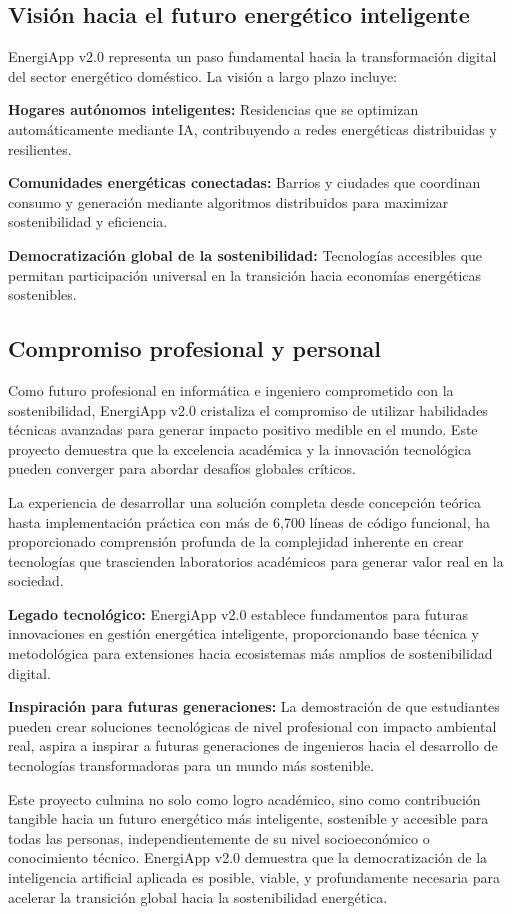 \subsection{Visión hacia el futuro energético inteligente}

EnergiApp v2.0 representa un paso fundamental hacia la transformación digital del sector energético doméstico. La visión a largo plazo incluye:

\textbf{Hogares autónomos inteligentes:} Residencias que se optimizan automáticamente mediante IA, contribuyendo a redes energéticas distribuidas y resilientes.

\textbf{Comunidades energéticas conectadas:} Barrios y ciudades que coordinan consumo y generación mediante algoritmos distribuidos para maximizar sostenibilidad y eficiencia.

\textbf{Democratización global de la sostenibilidad:} Tecnologías accesibles que permitan participación universal en la transición hacia economías energéticas sostenibles.

\subsection{Compromiso profesional y personal}

Como futuro profesional en informática e ingeniero comprometido con la sostenibilidad, EnergiApp v2.0 cristaliza el compromiso de utilizar habilidades técnicas avanzadas para generar impacto positivo medible en el mundo. Este proyecto demuestra que la excelencia académica y la innovación tecnológica pueden converger para abordar desafíos globales críticos.

La experiencia de desarrollar una solución completa desde concepción teórica hasta implementación práctica con más de 6,700 líneas de código funcional, ha proporcionado comprensión profunda de la complejidad inherente en crear tecnologías que trascienden laboratorios académicos para generar valor real en la sociedad.

\textbf{Legado tecnológico:} EnergiApp v2.0 establece fundamentos para futuras innovaciones en gestión energética inteligente, proporcionando base técnica y metodológica para extensiones hacia ecosistemas más amplios de sostenibilidad digital.

\textbf{Inspiración para futuras generaciones:} La demostración de que estudiantes pueden crear soluciones tecnológicas de nivel profesional con impacto ambiental real, aspira a inspirar a futuras generaciones de ingenieros hacia el desarrollo de tecnologías transformadoras para un mundo más sostenible.

Este proyecto culmina no solo como logro académico, sino como contribución tangible hacia un futuro energético más inteligente, sostenible y accesible para todas las personas, independientemente de su nivel socioeconómico o conocimiento técnico. EnergiApp v2.0 demuestra que la democratización de la inteligencia artificial aplicada es posible, viable, y profundamente necesaria para acelerar la transición global hacia la sostenibilidad energética.
